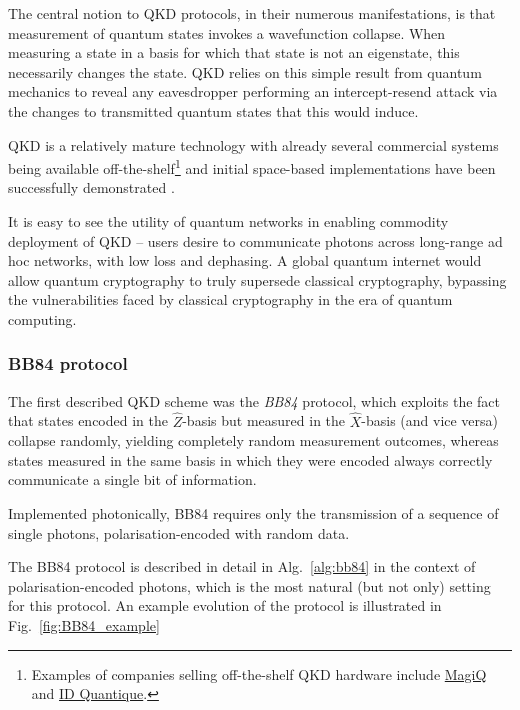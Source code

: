 The central notion to QKD protocols, in their numerous manifestations, is that measurement of quantum states invokes a wavefunction collapse. When measuring a state in a basis for which that state is not an eigenstate, this necessarily changes the state. QKD relies on this simple result from quantum mechanics to reveal any eavesdropper performing an intercept-resend attack via the changes to transmitted quantum states that this would induce.

QKD is a relatively mature technology with already several commercial systems being available off-the-shelf\footnote{Examples of companies selling off-the-shelf QKD hardware include \href{http://www.magiqtech.com}{MagiQ} and \href{http://www.idquantique.com}{ID Quantique}.} and initial space-based implementations have been successfully demonstrated \cite{Pan}.

It is easy to see the utility of quantum networks in enabling commodity deployment of QKD -- users desire to communicate photons across long-range ad hoc networks, with low loss and dephasing. A global quantum internet would allow quantum cryptography to truly supersede classical cryptography, bypassing the vulnerabilities faced by classical cryptography in the era of quantum computing.

%
%

\subsubsection{BB84 protocol}

The first described QKD scheme was the \textit{BB84} \cite{bib:BennetBrassard84} protocol, which exploits the fact that states encoded in the $\hat{Z}$-basis but measured in the $\hat{X}$-basis (and vice versa) collapse randomly, yielding completely random measurement outcomes, whereas states measured in the same basis in which they were encoded always correctly communicate a single bit of information.

Implemented photonically, BB84 requires only the transmission of a sequence of single photons, polarisation-encoded with random data.

The BB84 protocol is described in detail in Alg.~\ref{alg:bb84} in the context of polarisation-encoded photons, which is the most natural (but not only) setting for this protocol. An example evolution of the protocol is illustrated in Fig.~\ref{fig:BB84_example}

